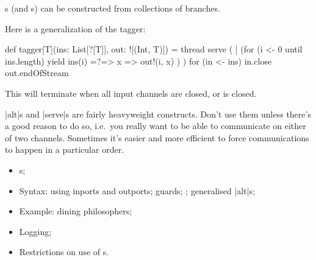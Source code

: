 \documentclass[notes,color]{sepslide0}
\begin{document}
\begin{slide}

s (and s) can be constructed from collections of
branches.

Here is a generalization of the tagger:
%
\begin{scala}
def tagger[T](ins: List[?[T]], out: ![(Int, T)]) = thread{
  serve ( 
    | (for (i <- 0 until ins.length) yield ins(i) =?=> { x => out!(i, x) })
  )
  for (in <- ins) in.close
  out.endOfStream
}
\end{scala}

This will terminate when all input channels are closed, or  is
closed. 
\end{slide}


\begin{slide}

|alt|s and |serve|s are fairly heavyweight constructs.  Don't use them unless
there's a good reason to do so, i.e.~you really want to be able to communicate
on either of two channels.
Sometimes it's easier and more efficient to force communications to happen in
a particular order.
\end{slide}


\begin{slide}

\begin{itemize}
\item
{}s;

\item
Syntax: using inports and outports; guards; ; generalised |alt|s;

\item
Example: dining philosophers;

\item
Logging;


\item
Restrictions on use of s. 
\end{itemize}
\end{slide}
\end{document}
